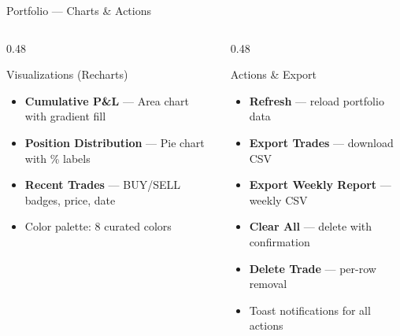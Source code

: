 \documentclass[aspectratio=169, 11pt]{beamer}
\begin{document}
\begin{frame}{Portfolio — Charts \& Actions}
\begin{columns}[T]
\begin{column}{0.48\textwidth}
\begin{block}{Visualizations (Recharts)}
\begin{itemize}
  \item \textbf{Cumulative P\&L} — Area chart with gradient fill
  \item \textbf{Position Distribution} — Pie chart with \% labels
  \item \textbf{Recent Trades} — BUY/SELL badges, price, date
  \item Color palette: 8 curated colors
\end{itemize}
\end{block}
\end{column}
\begin{column}{0.48\textwidth}
\begin{block}{Actions \& Export}
\begin{itemize}
  \item \textbf{Refresh} — reload portfolio data
  \item \textbf{Export Trades} — download CSV
  \item \textbf{Export Weekly Report} — weekly CSV
  \item \textbf{Clear All} — delete with confirmation
  \item \textbf{Delete Trade} — per-row removal
  \item Toast notifications for all actions
\end{itemize}
\end{block}
\end{column}
\end{columns}
\end{frame}

\end{document}
